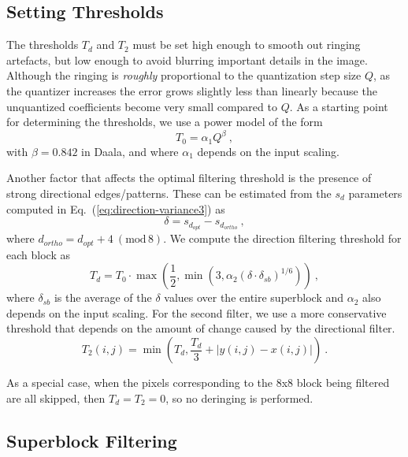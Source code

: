 \documentclass[smallabstract,smallcaptions]{dccpaper}
\begin{document}
\subsection{Setting Thresholds}

The thresholds $T_{d}$ and $T_{2}$ must be set high enough to smooth
out ringing artefacts, but low enough to avoid blurring important
details in the image. Although the ringing is \emph{roughly} proportional
to the quantization step size $Q$, as the quantizer increases the
error grows slightly less than linearly because the unquantized coefficients
become very small compared to $Q$. As a starting point for determining
the thresholds, we use a power model of the form
\begin{equation}
T_{0}=\alpha_{1}Q^{\beta}\ ,\label{eq:setting-Td}
\end{equation}
with $\beta=0.842$ in Daala, and where $\alpha_{1}$ depends on the
input scaling.

Another factor that affects the optimal filtering threshold is the
presence of strong directional edges/patterns. These can be estimated
from the $s_{d}$ parameters computed in Eq.~(\ref{eq:direction-variance3})
as
\begin{equation}
\delta=s_{d_{opt}}-s_{d_{ortho}}\ ,\label{eq:variande-delta}
\end{equation}
where $d_{ortho}=d_{opt}+4\ \left(\mathrm{mod}\,8\right)$. We compute
the direction filtering threshold for each block as
\[
T_{d}=T_{0}\cdot\max\left(\frac{1}{2},\min\left(3,\alpha_{2}\left(\delta\cdot\delta_{sb}\right)^{1/6}\right)\right)\ ,
\]
where $\delta_{sb}$ is the average of the $\delta$ values over the
entire superblock and $\alpha_{2}$ also depends on the input scaling.
For the second filter, we use a more conservative threshold that depends
on the amount of change caused by the directional filter.
\begin{equation}
T_{2}\left(i,j\right)=\min\left(T_{d},\frac{T_{d}}{3}+\left|y\left(i,j\right)-x\left(i,j\right)\right|\right)\ .\label{eq:setting-T2}
\end{equation}


As a special case, when the pixels corresponding to the 8x8 block
being filtered are all skipped, then $T_{d}=T_{2}=0$, so no deringing
is performed.


\subsection{Superblock Filtering}
\end{document}
